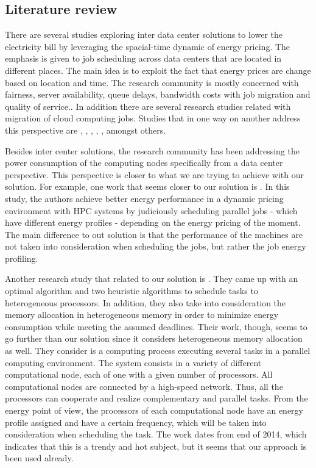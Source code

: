 \subsection*{Literature review}

There are several studies exploring inter data center solutions to lower
the electricity bill by leveraging the spacial-time dynamic of energy pricing. The 
emphasis is given to job scheduling across data centers that are located in 
different places. The main idea is to exploit the fact that energy prices 
are change based on location and time. The research community is mostly concerned 
with fairness, server availability, queue delays, bandwidth costs with job migration
and quality of service.. In addition there are several research studies related with 
migration of cloud computing jobs. Studies that in one way on another address this 
perspective are \cite{EFF_JOB_SCHEDULING}, \cite{MIGRATION_CLOUD}, 
\cite{MINIMIZING_DIST}, \cite{CUTTING_BILL}, \cite{SCHED_HETEROGE}, amongst others. 

Besides inter center solutions, the research community has been addressing the power 
consumption of the computing nodes specifically from a data center perspective.
This perspective is closer to what we are trying to achieve with our solution.
For example, one work that seems closer to our solution is \cite{DYN_PRICING_HPC}.
In this study, the authors achieve better energy performance in a dynamic
pricing environment with HPC systems by judiciously scheduling parallel jobs -
which have different energy profiles - depending on the energy pricing of the
moment. The main difference to out solution is that the performance of the machines 
are not taken into consideration when scheduling the jobs, but rather the job energy 
profiling.

Another research study that related to our solution is \cite{TASK_SCHED}. They
came up with an optimal algorithm and two heuristic algorithms to schedule tasks
to heterogeneous processors. In addition, they also take into consideration the 
memory allocation in heterogeneous memory in order
to minimize energy consumption while meeting the assumed deadlines. Their work,
though, seems to go further than our solution since it considers heterogeneous
memory allocation as well. They consider is a
computing process executing several tasks in a parallel computing environment. The
system consists in a variety of different computational node, each of one with a
given number of processors. All computational nodes are connected by a
high-speed network. Thus, all  the processors can cooperate and realize complementary
and parallel tasks. From the energy point of view, the processors of each 
computational node have an energy profile assigned and have a certain frequency, 
which will be taken into consideration when scheduling the task. The work dates 
from end of 2014, which indicates that this is a trendy and hot subject, but it 
seems that our approach is been used already. 

